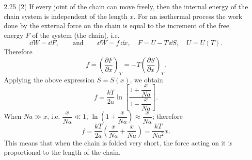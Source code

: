 \begin{solution}{2.25}
(2) If every joint of the chain can move freely, then the internal energy of the chain system is
independent of the length $x$. For an isothermal process the work done by the external force on
the chain is equal to the increment of the free energy $F$ of the system (the chain), i.e.
\begin{equation*}
\dd W = \dd F,\qquad\text{and}\qquad \dd W = f\,\dd x,\quad
F = U-T\,\dd S,\quad U=U(T).
\end{equation*}
Therefore
\begin{equation*}
f = \left(\frac{\partial F}{\partial x}\right)_T
= -T\left(\frac{\partial S}{\partial x}\right)_T .
\end{equation*}
Applying the above expression $S=S(x)$, we obtain
\begin{equation*}
f = \frac{kT}{2a}\ln\left[\frac{1+\dfrac{x}{Na}}{1-\dfrac{x}{Na}}\right].
\end{equation*}
When $Na\gg x$, i.e. $\dfrac{x}{Na}\ll 1$, $\ln\left(1+\dfrac{x}{Na}\right)\approx\dfrac{x}{Na}$;
therefore
\begin{equation*}
f = \frac{kT}{2a}\left(\frac{x}{Na}+\frac{x}{Na}\right) = \frac{kT}{Na^2}x .
\end{equation*}
This means that when the chain is folded very short, the force acting on it is proportional to the
length of the chain.
\end{solution}

